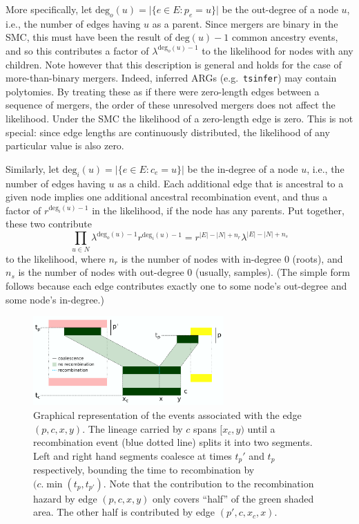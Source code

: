 \documentclass{article}
\renewcommand{\deg}{\mathrm{deg}}
\begin{document}
More specifically,
let $\deg_o(u) = \vert\{e \in E : p_e=u\}\vert$ be the out-degree of a node $u$,
i.e., the number of edges having $u$ as a parent.
Since mergers are binary in the SMC,
this must have been the result of $\deg(u) - 1$ common ancestry events,
and so this contributes a factor of $\lambda^{\deg_o(u)-1}$ to the likelihood
for nodes with any children.
Note however that this description is general and holds for the case of
more-than-binary mergers. Indeed, inferred ARGs (e.g.\ \texttt{tsinfer}) may
contain polytomies. By treating these as if there were zero-length edges
between a sequence of mergers, the order of these unresolved mergers does 
not affect the likelihood. Under the SMC the likelihood of a zero-length edge is zero.
This is not special: since edge lengths are continuously distributed,
the likelihood of any particular value is also zero.

Similarly,
let $\deg_i(u) = \vert\{e \in E : c_e=u\}\vert$ be the in-degree of a node $u$,
i.e., the number of edges having $u$ as a child.
Each additional edge that is ancestral to a given node
implies one additional ancestral recombination event,
and thus a factor of  $r^{\deg_i(u)-1}$ in the likelihood,
if the node has any parents.
Put together, these two contribute
\begin{equation}\label{eq:coal}
    \prod_{u \in N} \lambda^{\deg_o(u)-1} r^{\deg_i(u)-1}  
    =
    r^{|E|-|N|+n_r} 
    \lambda^{|E|-|N|+n_s} 
\end{equation}
to the likelihood,
where $n_r$ is the number of nodes with in-degree 0 (roots),
and $n_s$ is the number of nodes with out-degree 0 (usually, samples).
(The simple form follows because each edge contributes exactly one
to some node's out-degree and some node's in-degree.)


\begin{figure}
    \centering
    \includegraphics[width=0.65\textwidth]{figures/single_event.png}
    \caption{
        Graphical representation of the events associated with the edge $(p,c,x,y)$.
        The lineage carried by $c$ spans $[x_c,y)$ until a recombination event (blue dotted line) splits it
        into two segments. Left and right hand segments coalesce at times $t_p'$ and $t_p$ respectively,
        bounding the time to recombination by $(c. \min(t_p, t_{p'})$.
        Note that the contribution to the recombination hazard by edge $(p,c,x,y)$ only covers ``half'' of the
        green shaded area. The other half is contributed by edge $(p', c, x_c, x)$. 
        \label{fig:likelihood}
    }
\end{figure}
\end{document}
